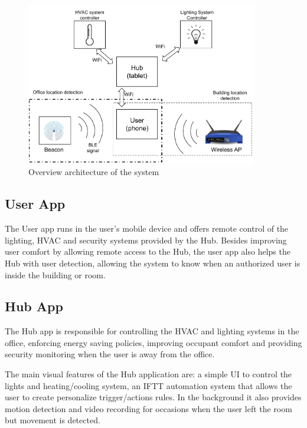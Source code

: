 \begin{figure}[h]
\centering
\includegraphics[width=0.9\textwidth]{Figures/harware_arch}
\caption{Overview architecture of the system}
\label{software1}
\end{figure}


\subsection{User App}

The User app runs in the user's mobile device and offers remote control of the lighting, \ac{HVAC} and security systems provided by the Hub. Besides improving user comfort by allowing remote access to the Hub, the user app also helps the Hub with user detection, allowing the system to know when an authorized user is inside the building or room.



\subsection{Hub App}

The Hub app is responsible for controlling the \ac{HVAC} and lighting systems in the office, enforcing energy saving policies, improving occupant comfort and providing security monitoring when the user is away from the office.

The main visual features of the Hub application are: a simple \ac{UI} to control the lights and heating/cooling system, an \ac{IFTT} automation system that allows the user to create personalize trigger/actions rules. In the background it also provides motion detection and video recording for occasions when the user left the room but movement is detected.


